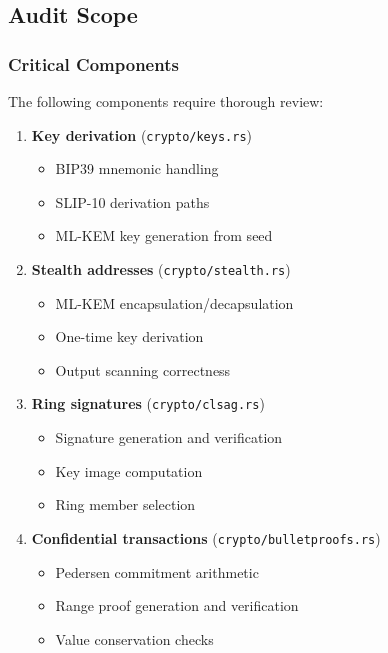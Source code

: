 \subsection{Audit Scope}

\subsubsection{Critical Components}

The following components require thorough review:

\begin{enumerate}
  \item \textbf{Key derivation} (\texttt{crypto/keys.rs})
    \begin{itemize}
      \item BIP39 mnemonic handling
      \item SLIP-10 derivation paths
      \item ML-KEM key generation from seed
    \end{itemize}

  \item \textbf{Stealth addresses} (\texttt{crypto/stealth.rs})
    \begin{itemize}
      \item ML-KEM encapsulation/decapsulation
      \item One-time key derivation
      \item Output scanning correctness
    \end{itemize}

  \item \textbf{Ring signatures} (\texttt{crypto/clsag.rs})
    \begin{itemize}
      \item Signature generation and verification
      \item Key image computation
      \item Ring member selection
    \end{itemize}

  \item \textbf{Confidential transactions} (\texttt{crypto/bulletproofs.rs})
    \begin{itemize}
      \item Pedersen commitment arithmetic
      \item Range proof generation and verification
      \item Value conservation checks
    \end{itemize}


\end{enumerate}
